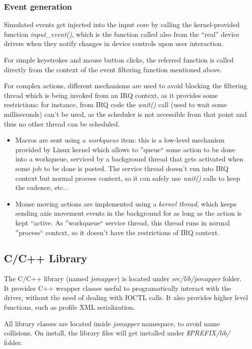 \subsubsection{Event generation}
Simulated events get injected into the input core by calling the kernel-provided function \emph{input\_event()}, which is the function called also from the ``real'' device drivers when they notify changes in device controls upon user interaction.

For simple keystrokes and mouse button clicks, the referred function is called directly from the context of the event filtering function mentioned above. 

For complex actions, different mechanisms are used to avoid blocking the filtering thread which is being invoked from an IRQ context, as it provides some restrictions: for instance, from IRQ code the \emph{wait()} call (used to wait some milliseconds) can't be used, as the scheduler is not accessible from that point and thus no other thread can be scheduled.
\begin{itemize}
 \item Macros are sent using a \emph{workqueue} item: this is a low-level mechanism provided by Linux kernel which allows to ''queue`` some action to be done into a workqueue, serviced by a background thread that gets activated when some job to be done is posted. The service thread doesn't run into IRQ context but normal process context, so it can safely use \emph{wait()} calls to keep the cadence, etc...
 \item Mouse moving actions are implemented using a \emph{kernel thread}, which keeps sending axis movement events in the background for as long as the action is kept ``active. As ''workqueue`` service thread, this thread runs in normal ''process`` context, so it doesn't have the restrictions of IRQ context.
\end{itemize}


\subsection{C/C++ Library}
The C/C++ library (named \emph{jsmapper}) is located under \emph{src/lib/jsmapper} folder. It provides C++ wrapper classes useful to programatically interact with the driver, without the need of dealing with IOCTL calls. It also provides higher level functions, such as profile XML serialization.

All library classes are located inside \emph{jsmapper} namespace, to avoid name collisions. On install, the library files will get installed under \emph{\$PREFIX/lib/} folder.

